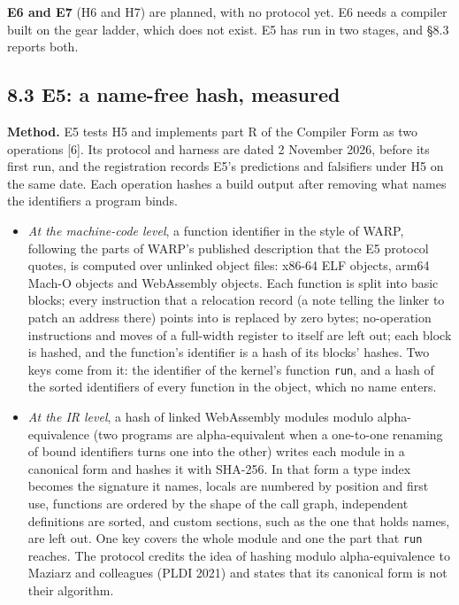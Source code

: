 \documentclass[10pt,letterpaper]{article}
\providecommand{\tightlist}{\setlength{\itemsep}{1pt}\setlength{\parskip}{0pt}}
\begin{document}
\textbf{E6 and E7} (H6 and H7) are planned, with no protocol yet. E6
needs a compiler built on the gear ladder, which does not exist. E5 has
run in two stages, and §8.3 reports both.

\subsection{8.3 E5: a name-free hash,
measured}\label{e5-a-name-free-hash-measured}

\textbf{Method.} E5 tests H5 and implements part R of the Compiler Form
as two operations {[}6{]}. Its protocol and harness are dated 2 November
2026, before its first run, and the registration records E5's
predictions and falsifiers under H5 on the same date. Each operation
hashes a build output after removing what names the identifiers a
program binds.

\begin{itemize}
\tightlist
\item
  \emph{At the machine-code level}, a function identifier in the style
  of WARP, following the parts of WARP's published description that the
  E5 protocol quotes, is computed over unlinked object files: x86-64 ELF
  objects, arm64 Mach-O objects and WebAssembly objects. Each function
  is split into basic blocks; every instruction that a relocation record
  (a note telling the linker to patch an address there) points into is
  replaced by zero bytes; no-operation instructions and moves of a
  full-width register to itself are left out; each block is hashed, and
  the function's identifier is a hash of its blocks' hashes. Two keys
  come from it: the identifier of the kernel's function \texttt{run},
  and a hash of the sorted identifiers of every function in the object,
  which no name enters.
\item
  \emph{At the IR level}, a hash of linked WebAssembly modules modulo
  alpha-equivalence (two programs are alpha-equivalent when a one-to-one
  renaming of bound identifiers turns one into the other) writes each
  module in a canonical form and hashes it with SHA-256. In that form a
  type index becomes the signature it names, locals are numbered by
  position and first use, functions are ordered by the shape of the call
  graph, independent definitions are sorted, and custom sections, such
  as the one that holds names, are left out. One key covers the whole
  module and one the part that \texttt{run} reaches. The protocol
  credits the idea of hashing modulo alpha-equivalence to Maziarz and
  colleagues (PLDI 2021) and states that its canonical form is not their
  algorithm.
\end{itemize}
\end{document}
